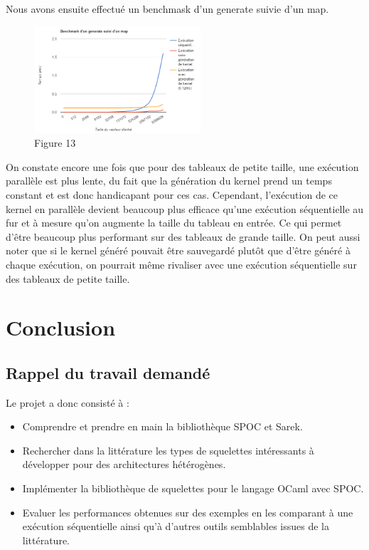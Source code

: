 \documentclass{report}
\begin{document}
\begin{enumerate}
Nous avons ensuite effectué un benchmask d'un generate suivie d'un map.\newline

\begin{figure}[!h]
\begin{center}
\includegraphics[height=150]{benchmark.png}
\end{center}
\caption{Figure 13}
\label{test}
\end{figure} \newline

On constate encore une fois que pour des tableaux de petite taille, une exécution parallèle est plus lente, du fait que la génération du kernel prend un temps constant et est donc handicapant pour ces cas.\newline
Cependant, l'exécution de ce kernel en parallèle devient beaucoup plus efficace qu'une exécution séquentielle au fur et à mesure qu'on augmente la taille du tableau en entrée. Ce qui permet d'être beaucoup plus performant sur des tableaux de grande taille.\newline
On peut aussi noter que si le kernel généré pouvait être sauvegardé plutôt que d'être généré à chaque exécution, on pourrait même rivaliser avec une exécution séquentielle sur des tableaux de petite taille.\newline

\chapter{Conclusion}
\section{Rappel du travail demandé}
Le projet a donc consisté à :
\begin{itemize}
\item Comprendre et prendre en main la bibliothèque SPOC et Sarek.
\item Rechercher dans la littérature les types de squelettes intéressants à développer  pour des architectures hétérogènes.
\item Implémenter la bibliothèque de squelettes pour le langage OCaml avec SPOC.
\item Evaluer les performances obtenues sur des exemples en les comparant à une exécution séquentielle ainsi qu'à d'autres outils semblables issues de la littérature. 
\end{itemize}


\end{enumerate}
\end{document}
